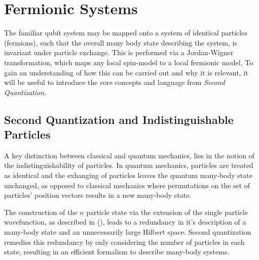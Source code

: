 \newpage
\section{Fermionic Systems}

The familiar qubit system may be mapped onto a system of identical particles (fermions), such that the 
overall many body state describing the system, is invariant under particle exchange. This is 
performed via a Jordan-Wigner transformation, which maps any local spin-model to a local fermionic model.
To gain an understanding of how this can be carried out and why it is relevant, it will be useful to introduce 
the core concepts and language from \textit{Second Quantization}.

\subsection{Second Quantization and Indistinguishable Particles}

A key distinction between classical and quantum mechanics, lies in the notion of the indistinguishability of particles.
In quantum mechanics, particles are treated as identical and the exhanging of particles leaves the quantum many-body state unchanged, as opposed to classical mechanics
where permutations on the set of particles' position vectors results in a new many-body state. 


The construction of the $n$ particle state via the extension of the single particle wavefunction, as described in (), 
leads to a redundancy in it's description of a many-body state and an unnecessarily large Hilbert space. Second quantization remedies this redundancy by only considering the number of particles in each state, resulting in an 
efficient formalism to describe many-body systems. 

